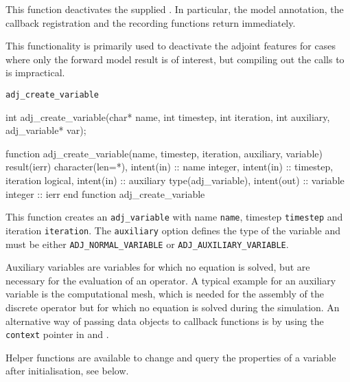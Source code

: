 This function deactivates the supplied .
In particular, the model annotation, the callback registration and the recording functions return  immediately. 

This functionality is primarily used to deactivate the adjoint features for cases where only the forward model result is of interest, 
but compiling out the calls to \libadjoint is impractical.



\begin{boxwithtitle}{\texttt{adj_create_variable}}
\begin{minipage}{\columnwidth}
\begin{ccode}
  int adj_create_variable(char* name, int timestep, int iteration, int auxiliary, 
                          adj_variable* var);
\end{ccode}
\begin{fortrancode}
  function adj_create_variable(name, timestep, iteration, auxiliary, variable) 
           result(ierr)
    character(len=*), intent(in) :: name
    integer, intent(in) :: timestep, iteration
    logical, intent(in) :: auxiliary
    type(adj_variable), intent(out) :: variable
    integer :: ierr
  end function adj_create_variable
\end{fortrancode}
\end{minipage}
\end{boxwithtitle}

This function creates an \texttt{adj_variable} with name \texttt{name}, timestep \texttt{timestep} and iteration \texttt{iteration}.
The \texttt{auxiliary} option defines the type of the variable and must be either \texttt{ADJ_NORMAL_VARIABLE} or \texttt{ADJ_AUXILIARY_VARIABLE}.

Auxiliary variables are variables for which no equation is solved, but are necessary for the evaluation of an operator.
A typical example for an auxiliary variable is the computational mesh, which is needed for the assembly of the discrete operator but for which no equation is solved during the simulation.
An alternative way of passing data objects to callback functions is by using the \texttt{context} pointer in  and .

Helper functions are available to change and query the properties of a variable after initialisation, see below. 



